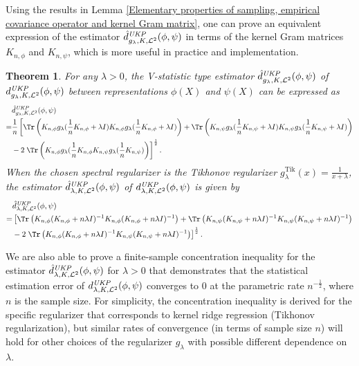 \documentclass{article} %
\newcommand{\repone}{\phi}
\newcommand{\reptwo}{\psi}
\newcommand{\Knone}{K_{n,\repone}}
\newcommand{\Kntwo}{K_{n,\reptwo}}
\newcommand{\Knonelambda}{\frac{1}{n}\Knone + \lambda I}
\newcommand{\Kntwolambda}{\frac{1}{n}\Kntwo + \lambda I}
\newcommand{\gl}{g_{\lambda}}
\newcommand{\glTik}{\gl^{\operatorname{Tik}}}
\newcommand{\metricstname}{UKP }
\newcommand{\dtwo}{d_{\lambda,K,\mathcal{L}^{2}}^{\emph{\metricstname}}}
\newcommand{\dtwohat}{\hat{d}_{\lambda,K,\mathcal{L}^{2}}^{\emph{\metricstname}}}
\newcommand{\dtwogl}{d_{\gl,K,\mathcal{L}^{2}}^{\emph{\metricstname}}}
\newcommand{\dtwoglhat}{\hat{d}_{\gl,K,\mathcal{L}^{2}}^{\emph{\metricstname}}}
\theoremstyle{plain}
\newcounter{theoremno}
\newtheorem{theorem}[theoremno]{Theorem}
\begin{document}
Using the results in Lemma \ref{Elementary properties of sampling, empirical covariance operator and kernel Gram matrix}, one can prove an equivalent expression of the estimator $\dtwoglhat(\repone,\reptwo)$ in terms of the kernel Gram matrices $\Knone$ and $\Kntwo$, which is more useful in practice and implementation.

\begin{theorem}\label{Estimator in terms of Gram matrices}
    For any $\lambda>0$, the V-statistic type estimator $\dtwoglhat(\repone,\reptwo)$ of  $\dtwogl(\repone,\reptwo)$ between representations $\repone(X)$ and $\reptwo(X)$ can be expressed as
    \[
    \begin{aligned}
        &\dtwoglhat(\repone,\reptwo)\\
        =& \frac{1}{n}\left[\Tr\left(\Knone\gl(\Knonelambda)\Knone\gl(\Knonelambda)\right) + \Tr\left(\Kntwo\gl(\Kntwolambda)\Kntwo\gl(\Kntwolambda)\right)\right.\\
        &-2\left.\Tr\left(\Knone\gl(\frac{1}{n}\Knone\Kntwo\gl(\frac{1}{n}\Kntwo)\right)\right]^{\frac{1}{2}}.
    \end{aligned}
    \]
    When the chosen spectral regularizer is the Tikhonov regularizer $\glTik(x) = \frac{1}{x+\lambda}$, the estimator $\dtwohat(\repone,\reptwo)$ of $\dtwo(\repone,\reptwo)$ is given by
    \[
    \begin{aligned}
        &\dtwohat(\repone,\reptwo)\\
        =& \left[\Tr\left(K_{n,\repone}(K_{n,\repone}+n\lambda I)^{-1}K_{n,\repone}(K_{n,\repone}+n\lambda I)^{-1}\right) + \Tr\left(K_{n,\reptwo}(K_{n,\reptwo}+n\lambda I)^{-1}K_{n,\reptwo}(K_{n,\reptwo}+n\lambda I)^{-1}\right)\right.\\
        &-2\left.\Tr\left(K_{n,\repone}(K_{n,\repone}+n\lambda I)^{-1}K_{n,\reptwo}(K_{n,\reptwo}+n\lambda I)^{-1}\right)\right]^{\frac{1}{2}}.
    \end{aligned}
    \]
\end{theorem}

We are also able to prove a finite-sample concentration inequality for the estimator $\dtwohat(\repone,\reptwo)$ for $\lambda>0$ that demonstrates that the statistical estimation error of $\dtwo(\repone,\reptwo)$ converges to 0 at the parametric rate $n^{-\frac{1}{2}}$, where $n$ is the sample size. For simplicity, the concentration inequality is derived for the specific regularizer that corresponds to kernel ridge regression (Tikhonov regularization), but similar rates of convergence (in terms of sample size $n$) will hold for other choices of the regularizer $\gl$ with possible different dependence on $\lambda$.
\end{document}

